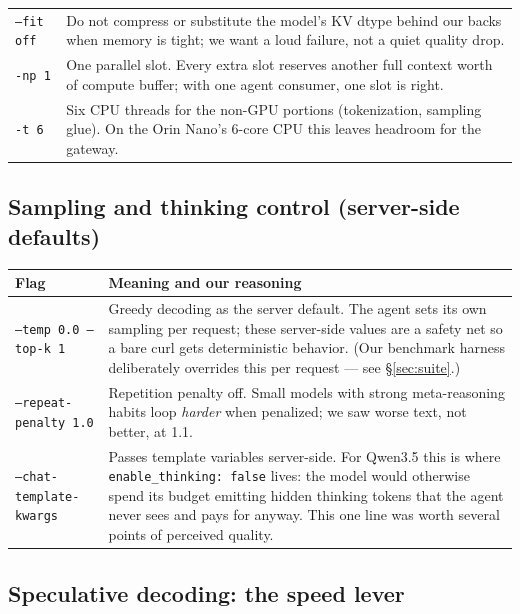 \documentclass[11pt,a4paper]{article}
\newcommand{\flag}[1]{\texttt{\textcolor{flagcolour}{#1}}}
\begin{document}
\begin{center}
\begin{tabularx}{\textwidth}{L{4.2cm} X}
\flag{--fit off} & Do not compress or substitute the model's KV dtype behind our backs when memory is tight; we want a loud failure, not a quiet quality drop. \\
\flag{-np 1} & One parallel slot. Every extra slot reserves another full context worth of compute buffer; with one agent consumer, one slot is right. \\
\flag{-t 6} & Six CPU threads for the non-GPU portions (tokenization, sampling glue). On the Orin Nano's 6-core CPU this leaves headroom for the gateway. \\
\bottomrule
\end{tabularx}
\end{center}

\subsection{Sampling and thinking control (server-side defaults)}

\begin{center}
\small
\begin{tabularx}{\textwidth}{L{4.6cm} X}
\toprule
\textbf{Flag} & \textbf{Meaning and our reasoning} \\
\midrule
\flag{--temp 0.0 --top-k 1} & Greedy decoding as the server default. The agent sets its own sampling per request; these server-side values are a safety net so a bare curl gets deterministic behavior. (Our benchmark harness deliberately overrides this per request --- see \S\ref{sec:suite}.) \\
\flag{--repeat-penalty 1.0} & Repetition penalty off. Small models with strong meta-reasoning habits loop \emph{harder} when penalized; we saw worse text, not better, at 1.1. \\
\flag{--chat-template-kwargs} & Passes template variables server-side. For Qwen3.5 this is where \texttt{enable\_thinking: false} lives: the model would otherwise spend its budget emitting hidden thinking tokens that the agent never sees and pays for anyway. This one line was worth several points of perceived quality. \\
\bottomrule
\end{tabularx}
\end{center}

\subsection{Speculative decoding: the speed lever}
\end{document}
